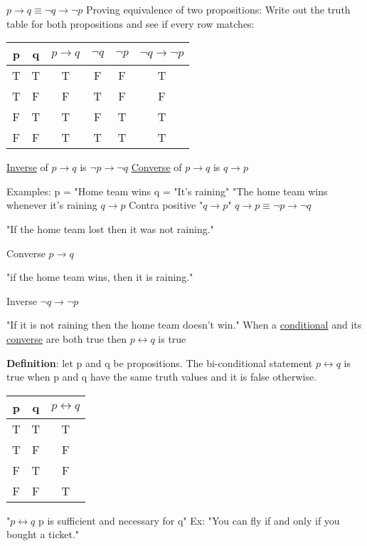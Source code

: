 \documentclass{article}
\begin{document}
$p\rightarrow q\equiv \neg q\rightarrow \neg p$
\hfill \break
Proving equivalence of two propositions:
\hfill \break
Write out the truth table for both propositions and see if every row matches:
\begin{center}
\begin{tabular}{ |c|c|c|c|c|c| } 
 \hline
 p & q & $p\rightarrow q$ & $\neg q$ & $\neg p$ & $\neg q \rightarrow \neg p$ \\ 
 \hline
 T & T & T & F & F & T \\ 
 T & F & F & T & F & F \\
 F & T & T & F & T & T \\
 F & F & T & T & T & T \\
 \hline
\end{tabular}
\end{center}
\underline{Inverse} of $p\rightarrow q$ is $\neg p \rightarrow \neg q$
\hfill \break
\underline{Converse} of $p\rightarrow q$ is $q\rightarrow p$

\hfill \break
Examples:
\hfill \break
p = "Home team wins
\hfill \break
q = "It's raining"
\hfill \break
"The home team wins whenever it's raining
\hfill \break
$q\rightarrow p$
\hfill \break
Contra positive "$q\rightarrow p$"
\hfill \break
$q\rightarrow p\equiv \neg p \rightarrow \neg q$

"If the home team lost then it was not raining."

\hfill \break
Converse $p\rightarrow q$

"if the home team wins, then it is raining."

\hfill \break
Inverse $\neg q \rightarrow \neg p$

"If it is not raining then the home team doesn't win."
\hfill \break
When a \underline{conditional} and its \underline{converse} are both true then $p\leftrightarrow q$ is true

\hfill \break
\textbf{Definition}: let p and q be propositions. The bi-conditional statement $p\leftrightarrow q$ is true when p and q have the same truth values and it is false otherwise.

\begin{center}
\begin{tabular}{ |c|c|c| } 
 \hline
 p & q & $p\leftrightarrow q$ \\ 
 \hline
 T & T & T \\
 T & F & F \\
 F & T & F \\
 F & F & T \\
 \hline
\end{tabular}
\end{center}
"$p\leftrightarrow q$ p is sufficient and necessary for q"
\hfill \break
Ex: "You can fly if and only if you bought a ticket."
\end{document}
